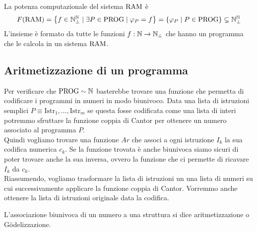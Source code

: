 La potenza computazionale del sistema $\text{RAM}$ è 
$$ F(\text{RAM}) = \left\{f \in \mathbb{N}^{\mathbb{N}}_\bot \mid \exists P \in \text{PROG} \mid \varphi_P = f \right\} = \left\{\varphi_P \mid P \in \text{PROG} \right\} \subsetneq \mathbb{N}^{\mathbb{N}}_\bot $$
L'insieme è formato da tutte le funzioni $f: \mathbb{N} \rightarrow \mathbb{N}_\bot$ che hanno un programma che le calcola in un sistema $\text{RAM}$.\\

\subsection{Aritmetizzazione di un programma}

Per verificare che $\text{PROG} \sim \mathbb{N}$ basterebbe trovare una funzione che permetta di codificare i programmi in numeri in modo biunivoco. Data una lista di istruzioni semplici $P \equiv \text{Istr}_1, \dots, \text{Istr}_m$ se questa fosse codificata come una lista di interi potremmo sfruttare la funzione coppia di Cantor per ottenere un numero associato al programma $P$.\\

Quindi vogliamo trovare una funzione $Ar$ che associ a ogni istruzione $I_k$ la sua codifica numerica $c_k$. Se la funzione trovata è anche biunivoca siamo sicuri di poter trovare anche la sua inversa, ovvero la funzione che ci permette di ricavare $I_k$ da $c_k$.\\

Riassumendo, vogliamo trasformare la lista di istruzioni un una lista di numeri su cui successivamente applicare la funzione coppia di Cantor. Vorremmo anche ottenere la lista di istruzioni originale data la codifica.
\begin{center}
	
\end{center} 
L'associazione biunivoca di un numero a una struttura si dice aritmetizzazione o G\"odelizzazione.\\

